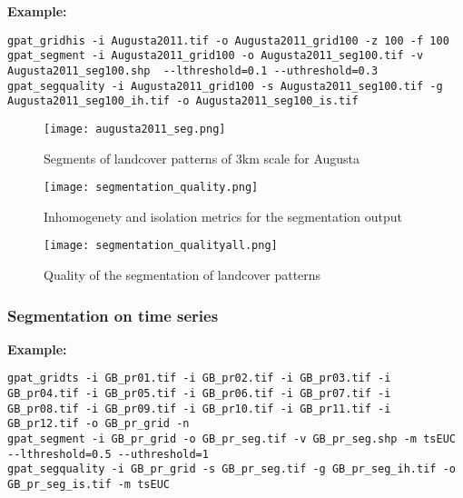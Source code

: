 {\bf Example:}

\begin{minipage}{\linewidth}
\begin{lstlisting}
gpat_gridhis -i Augusta2011.tif -o Augusta2011_grid100 -z 100 -f 100
gpat_segment -i Augusta2011_grid100 -o Augusta2011_seg100.tif -v Augusta2011_seg100.shp  --lthreshold=0.1 --uthreshold=0.3
gpat_segquality -i Augusta2011_grid100 -s Augusta2011_seg100.tif -g Augusta2011_seg100_ih.tif -o Augusta2011_seg100_is.tif
\end{lstlisting}
\end{minipage}

\begin{figure}[H]
	\centering
	\texttt{[image: augusta2011\_seg.png]}
	\caption{Segments of landcover patterns of 3km scale for Augusta}
	\label{FIG:SEG1}
\end{figure}

\begin{figure}[H]
	\centering
	\texttt{[image: segmentation\_quality.png]}
	\caption{Inhomogenety and isolation metrics for the segmentation output}
	\label{FIG:SEG2}
\end{figure}

\begin{figure}[H]
	\centering
	\texttt{[image: segmentation\_qualityall.png]}
	\caption{Quality of the segmentation of landcover patterns}
	\label{FIG:SEG3}
\end{figure}


\FloatBarrier

\subsubsection{Segmentation on time series}

{\bf Example:}

\begin{minipage}{\linewidth}
\begin{lstlisting}
gpat_gridts -i GB_pr01.tif -i GB_pr02.tif -i GB_pr03.tif -i GB_pr04.tif -i GB_pr05.tif -i GB_pr06.tif -i GB_pr07.tif -i GB_pr08.tif -i GB_pr09.tif -i GB_pr10.tif -i GB_pr11.tif -i GB_pr12.tif -o GB_pr_grid -n
gpat_segment -i GB_pr_grid -o GB_pr_seg.tif -v GB_pr_seg.shp -m tsEUC --lthreshold=0.5 --uthreshold=1
gpat_segquality -i GB_pr_grid -s GB_pr_seg.tif -g GB_pr_seg_ih.tif -o GB_pr_seg_is.tif -m tsEUC
\end{lstlisting}
\end{minipage}

